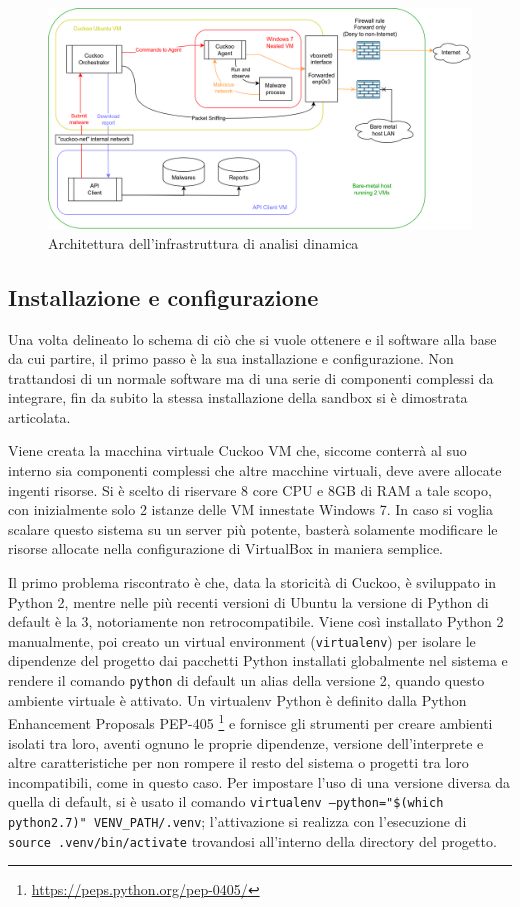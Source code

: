 \begin{figure}[H]
    \centering
    \includegraphics[width=\textwidth]{assets/cuckoo_vms.png}
    \caption{Architettura dell'infrastruttura di analisi dinamica}
    \label{fig:cuckoo_vms_architecture}
\end{figure}

\subsection{Installazione e configurazione}
\label{chap:cuckoo-installation-configuration-services}
Una volta delineato lo schema di ciò che si vuole ottenere e il software alla base da cui partire, il primo passo è la sua installazione e configurazione. Non trattandosi di un normale software ma di una serie di componenti complessi da integrare, fin da subito la stessa installazione della sandbox si è dimostrata articolata.

Viene creata la macchina virtuale Cuckoo VM che, siccome conterrà al suo interno sia componenti complessi che altre macchine virtuali, deve avere allocate ingenti risorse. Si è scelto di riservare 8 core CPU e 8GB di RAM a tale scopo, con inizialmente solo 2 istanze delle VM innestate Windows 7. In caso si voglia scalare questo sistema su un server più potente, basterà solamente modificare le risorse allocate nella configurazione di VirtualBox in maniera semplice.

Il primo problema riscontrato è che, data la storicità di Cuckoo, è sviluppato in Python 2, mentre nelle più recenti versioni di Ubuntu la versione di Python di default è la 3, notoriamente non retrocompatibile.
Viene così installato Python 2 manualmente, poi creato un virtual environment (\texttt{virtualenv}) per isolare le dipendenze del progetto dai pacchetti Python installati globalmente nel sistema e rendere il comando \texttt{python} di default un alias della versione 2, quando questo ambiente virtuale è attivato.
Un virtualenv Python è definito dalla Python Enhancement Proposals PEP-405
\footnote{\url{https://peps.python.org/pep-0405/}}
e fornisce gli strumenti per creare ambienti isolati tra loro, aventi ognuno le proprie dipendenze, versione dell'interprete e altre caratteristiche per non rompere il resto del sistema o progetti tra loro incompatibili, come in questo caso.
Per impostare l'uso di una versione diversa da quella di default, si è usato il comando \texttt{virtualenv --python="\$(which python2.7)" VENV\_PATH/.venv}; l'attivazione si realizza con l'esecuzione di \texttt{source .venv/bin/activate} trovandosi all'interno della directory del progetto.

